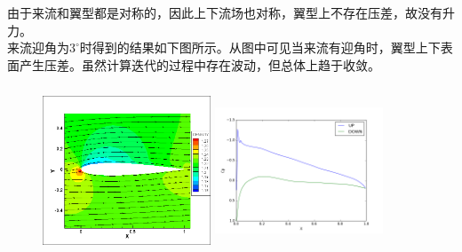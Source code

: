 \documentclass[UTF8]{ctexart}
\begin{document}
\indent 由于来流和翼型都是对称的，因此上下流场也对称，翼型上不存在压差，故没有升力。\\
\indent 来流迎角为$3^\circ$时得到的结果如下图所示。从图中可见当来流有迎角时，翼型上下表面产生压差。虽然计算迭代的过程中存在波动，但总体上趋于收敛。\clearpage
\begin{figure}[htbp]\centering
  \begin{minipage}{5.5cm}
    \centering
    \includegraphics[height=5cm,width=5cm]{../pic/0.3_3_flowfield.png}
  \end{minipage}%
  \begin{minipage}{5.5cm}
    \centering
    \includegraphics[height=5cm,width=5cm]{../pic/0.3_3_Cp.png}
  \end{minipage}


\end{figure}
\end{document}
